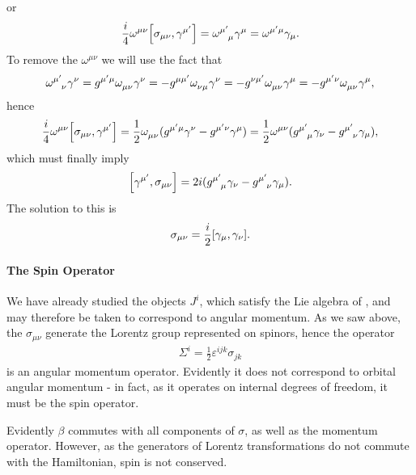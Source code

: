 or
\begin{align*}
	\frac{i}{4}\omega^{\mu\nu}\comm{\sigma_{\mu\nu}}{\gamma^{\mu\p}} = \tensor{\omega}{^{\mu\p}_{\mu}}\gamma^{\mu} = \tensor{\omega}{^{\mu\p\mu}}\gamma_{\mu}.
\end{align*}
To remove the $\omega^{\mu\nu}$ we will use the fact that
\begin{align*}
	\tensor{\omega}{^{\mu\p}_{\nu}}\gamma^{\nu} = g^{\mu\p\mu}\tensor{\omega}{_{\mu\nu}}\gamma^{\nu} = -g^{\mu\mu\p}\tensor{\omega}{_{\nu\mu}}\gamma^{\nu} = -g^{\nu\mu\p}\tensor{\omega}{_{\mu\nu}}\gamma^{\mu} = -g^{\mu\p\nu}\tensor{\omega}{_{\mu\nu}}\gamma^{\mu},
\end{align*}
hence
\begin{align*}
	\frac{i}{4}\omega^{\mu\nu}\comm{\sigma_{\mu\nu}}{\gamma^{\mu\p}} = \frac{1}{2}\tensor{\omega}{_{\mu\nu}}(g^{\mu\p\mu}\gamma^{\nu} - g^{\mu\p\nu}\gamma^{\mu}) = \frac{1}{2}\tensor{\omega}{^{\mu\nu}}(\tensor{g}{^{\mu\p}_{\mu}}\gamma_{\nu} - \tensor{g}{^{\mu\p}_{\nu}}\gamma_{\mu}),
\end{align*}
which must finally imply
\begin{align*}
	\comm{\gamma^{\mu\p}}{\sigma_{\mu\nu}} = 2i(\tensor{g}{^{\mu\p}_{\mu}}\gamma_{\nu} - \tensor{g}{^{\mu\p}_{\nu}}\gamma_{\mu}).
\end{align*}
The solution to this is
\begin{align*}
	\sigma_{\mu\nu} = \frac{i}{2}\comm{\gamma_{\mu}}{\gamma_{\nu}}.
\end{align*}

\paragraph{The Spin Operator}
We have already studied the objects $J^{i}$, which satisfy the Lie algebra of , and may therefore be taken to correspond to angular momentum. As we saw above, the $\sigma_{\mu\nu}$ generate the Lorentz group represented on spinors, hence the operator
\begin{align*}
	\Sigma^{i} = \frac{1}{2}\varepsilon^{ijk}\sigma_{jk}
\end{align*}
is an angular momentum operator. Evidently it does not correspond to orbital angular momentum - in fact, as it operates on internal degrees of freedom, it must be the spin operator.

Evidently $\beta$ commutes with all components of $\sigma$, as well as the momentum operator. However, as the generators of Lorentz transformations do not commute with the Hamiltonian, spin is not conserved.

